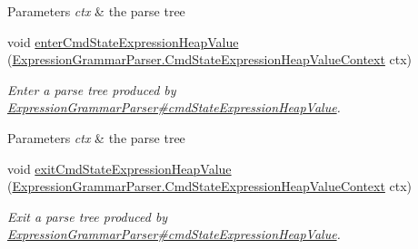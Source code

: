 \begin{DoxyCompactItemize}
\begin{DoxyCompactList}
\begin{DoxyParams}{Parameters}
{\em ctx} & the parse tree\\
\hline
\end{DoxyParams}
 \end{DoxyCompactList}\item 
void \hyperlink{classgov_1_1nasa_1_1jpf_1_1inspector_1_1server_1_1expression_1_1parser_1_1_expression_grammar_base_listener_a13e5474abfbdccc4916a04d533f61ddb}{enter\+Cmd\+State\+Expression\+Heap\+Value} (\hyperlink{classgov_1_1nasa_1_1jpf_1_1inspector_1_1server_1_1expression_1_1parser_1_1_expression_grammar_pa975e8909fcf76b653e93728b8bf729a1}{Expression\+Grammar\+Parser.\+Cmd\+State\+Expression\+Heap\+Value\+Context} ctx)
\begin{DoxyCompactList}\small\item\em Enter a parse tree produced by \hyperlink{classgov_1_1nasa_1_1jpf_1_1inspector_1_1server_1_1expression_1_1parser_1_1_expression_grammar_parser_acdd2121f4c72d731261a0733e15bcfe6}{Expression\+Grammar\+Parser\#cmd\+State\+Expression\+Heap\+Value}.


\begin{DoxyParams}{Parameters}
{\em ctx} & the parse tree\\
\hline
\end{DoxyParams}
 \end{DoxyCompactList}\item 
void \hyperlink{classgov_1_1nasa_1_1jpf_1_1inspector_1_1server_1_1expression_1_1parser_1_1_expression_grammar_base_listener_a8994757c2d6e00c4ac23437edad10b48}{exit\+Cmd\+State\+Expression\+Heap\+Value} (\hyperlink{classgov_1_1nasa_1_1jpf_1_1inspector_1_1server_1_1expression_1_1parser_1_1_expression_grammar_pa975e8909fcf76b653e93728b8bf729a1}{Expression\+Grammar\+Parser.\+Cmd\+State\+Expression\+Heap\+Value\+Context} ctx)
\begin{DoxyCompactList}\small\item\em Exit a parse tree produced by \hyperlink{classgov_1_1nasa_1_1jpf_1_1inspector_1_1server_1_1expression_1_1parser_1_1_expression_grammar_parser_acdd2121f4c72d731261a0733e15bcfe6}{Expression\+Grammar\+Parser\#cmd\+State\+Expression\+Heap\+Value}.



\end{DoxyCompactList}
\end{DoxyCompactItemize}

